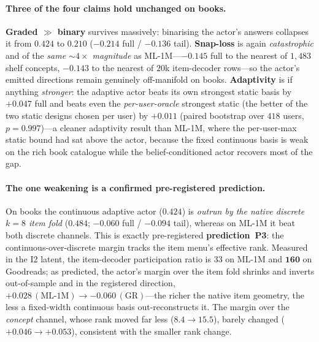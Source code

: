 \documentclass[11pt]{article}
\begin{document}
\paragraph{Three of the four claims hold unchanged on books.} \textbf{Graded $\gg$ binary} survives massively:
binarising the actor's answers collapses it from $0.424$ to $0.210$ ($-0.214$ full / $-0.136$ tail). \textbf{Snap-loss}
is again \emph{catastrophic} and of the \emph{same ${\sim}4\times$ magnitude} as ML-1M---$-0.145$ full to the nearest of
$1{,}483$ shelf concepts, $-0.143$ to the nearest of $20$k item-decoder rows---so the actor's emitted directions remain
genuinely off-manifold on books. \textbf{Adaptivity} is if anything \emph{stronger}: the adaptive actor beats its own
strongest static basis by $+0.047$ full and beats even the \emph{per-user-oracle} strongest static (the better of the
two static designs chosen per user) by $\mathbf{+0.011}$ (paired bootstrap over $418$ users, $p{=}0.997$)---a cleaner
adaptivity result than ML-1M, where the per-user-max static bound had sat above the actor, because the fixed continuous
basis is weak on the rich book catalogue while the belief-conditioned actor recovers most of the gap.

\paragraph{The one weakening is a confirmed pre-registered prediction.} On books the continuous adaptive actor ($0.424$)
is \emph{outrun by the native discrete $k{=}8$ item fold} ($0.484$; $-0.060$ full / $-0.094$ tail), whereas on ML-1M it
beat both discrete channels. This is exactly pre-registered \textbf{prediction~P3}: the continuous-over-discrete margin
tracks the item menu's effective rank. Measured in the I2 latent, the item-decoder participation ratio is $33$ on ML-1M
and $\mathbf{160}$ on Goodreads; as predicted, the actor's margin over the item fold shrinks and inverts out-of-sample
and in the registered direction, $+0.028\,(\text{ML-1M}) \to -0.060\,(\text{GR})$---the richer the native item
geometry, the less a fixed-width continuous basis out-reconstructs it. The margin over the \emph{concept} channel, whose
rank moved far less ($8.4\to15.5$), barely changed ($+0.046\to+0.053$), consistent with the smaller rank change.
\end{document}
